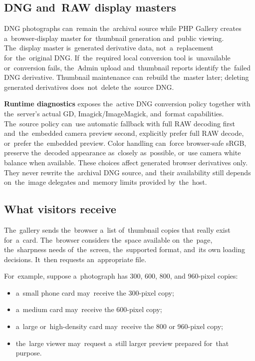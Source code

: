 \documentclass[11pt,a4paper]{article}
\newcommand{\ui}[1]{\textbf{#1}}
\begin{document}
\subsection{DNG and~RAW display masters}

DNG photographs can~remain the~archival source while PHP Gallery creates
a~browser-display master for~thumbnail generation and~public viewing.
The~display master is~generated derivative data, not~a~replacement
for~the~original DNG. If~the~required local conversion tool is~unavailable
or~conversion fails, the~Admin upload and~thumbnail reports identify the~failed
DNG derivative. Thumbnail maintenance can~rebuild the~master later; deleting
generated derivatives does~not~delete the~source DNG.

\ui{Runtime diagnostics} exposes the~active DNG conversion policy together with
the~server's actual GD, Imagick/ImageMagick, and~format capabilities. The~source
policy can~use automatic fallback with full RAW decoding first and~the~embedded
camera preview second, explicitly prefer full RAW decode, or~prefer the~embedded
preview. Color handling can~force browser-safe sRGB, preserve the~decoded
appearance as~closely as~possible, or~use camera white balance when available.
These choices affect generated browser derivatives only. They never rewrite
the~archival DNG source, and~their availability still depends on~the~image
delegates and~memory limits provided by~the~host.

\subsection{What visitors receive}

The~gallery sends the~browser a~list of~thumbnail copies that really exist
for~a~card. The~browser considers the~space available on~the~page, the~sharpness
needs of~the~screen, the~supported format, and~its own loading decisions.
It~then requests an~appropriate file.

For~example, suppose a~photograph has 300, 600, 800, and 960-pixel copies:

\begin{itemize}
  \item a~small phone card may~receive the 300-pixel copy;
  \item a~medium card may~receive the 600-pixel copy;
  \item a~large or~high-density card may~receive the 800 or 960-pixel copy;
  \item the~large viewer may~request a~still larger preview prepared for~that
  purpose.
\end{itemize}
\end{document}
